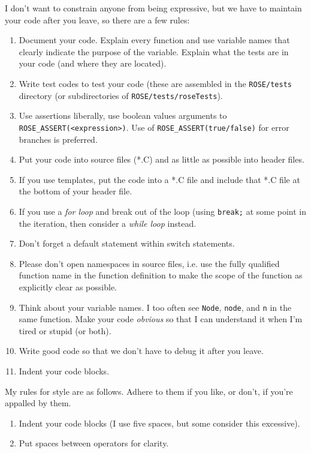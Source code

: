    I don't want to constrain anyone from being expressive, but
we have to maintain your code after you leave, so there are a few rules:
\begin{enumerate}
   \item Document your code.
         Explain every function and use variable names that clearly indicate the purpose of
         the variable. Explain what the tests are in your code (and where they are located).
   \item Write test codes to test your code (these are assembled in the {\tt ROSE/tests}
         directory (or subdirectories of {\tt ROSE/tests/roseTests}).
   \item Use assertions liberally, use boolean values arguments to 
         {\tt ROSE\_ASSERT(<expression>)}. Use of {\tt ROSE\_ASSERT(true/false)} for
         error branches is preferred.
   \item Put your code into source files (*.C) and as little as possible into header files.
   \item If you use templates, put the code into a *.C file and include that *.C file
         at the bottom of your header file.
   \item If you use a {\em for loop} and break out of the loop (using {\tt break;} 
         at some point in the iteration, then consider a {\em while loop} instead.
   \item Don't forget a default statement within switch statements.
   \item Please don't open namespaces in source files, i.e. use the fully qualified
         function name in the function definition to make the scope of the function
         as explicitly clear as possible.
   \item Think about your variable names. I too often see {\tt Node}, {\tt node}, 
         and {\tt n} in the same function.  Make your code {\em obvious} so that I 
         can understand it when I'm tired or stupid (or both).
   \item Write good code so that we don't have to debug it after you leave.
   \item Indent your code blocks.
\end{enumerate}

My rules for style are as follows. Adhere to them if you like, or don't, if you're
    appalled by them.
\begin{enumerate}
   \item Indent your code blocks (I use five spaces, but some consider this excessive).
   \item Put spaces between operators for clarity.
\end{enumerate}



